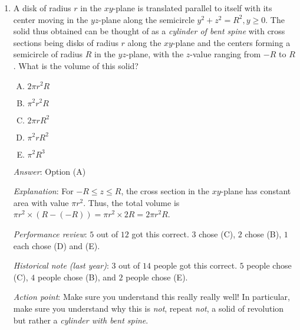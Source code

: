 \documentclass[10pt]{amsart}
\begin{document}
\begin{enumerate}
\item A disk of radius $r$ in the $xy$-plane is translated parallel to
  itself with its center moving in the $yz$-plane along the semicircle
  $y^2 + z^2 = R^2, y \ge 0$. The solid thus obtained can be thought
  of as a {\em cylinder of bent spine} with cross sections being disks
  of radius $r$ along the $xy$-plane and the centers forming a
  semicircle of radius $R$ in the $yz$-plane, with the $z$-value
  ranging from $-R$ to $R$. What is the volume of this solid?

  \begin{enumerate}[(A)]
  \item $2\pi r^2R$
  \item $\pi^2r^2R$
  \item $2\pi rR^2$
  \item $\pi^2rR^2$
  \item $\pi^2R^3$
  \end{enumerate}

  {\em Answer}: Option (A)

  {\em Explanation}: For $-R \le z \le R$, the cross section in the
  $xy$-plane has constant area with value $\pi r^2$. Thus, the total
  volume is $\pi r^2 \times (R - (-R)) = \pi r^2 \times 2R = 2\pi
  r^2R$.

  {\em Performance review}: $5$ out of $12$ got this correct. $3$
  chose (C), $2$ chose (B), $1$ each chose (D) and (E).

  {\em Historical note (last year)}: $3$ out of $14$ people got this
  correct. $5$ people chose (C), $4$ people chose (B), and $2$ people
  chose (E).

  {\em Action point}: Make sure you understand this really really
  well! In particular, make sure you understand why this is {\em not},
  repeat {\em not}, a solid of revolution but rather a {\em cylinder
  with bent spine}.
\end{enumerate}
\end{document}
